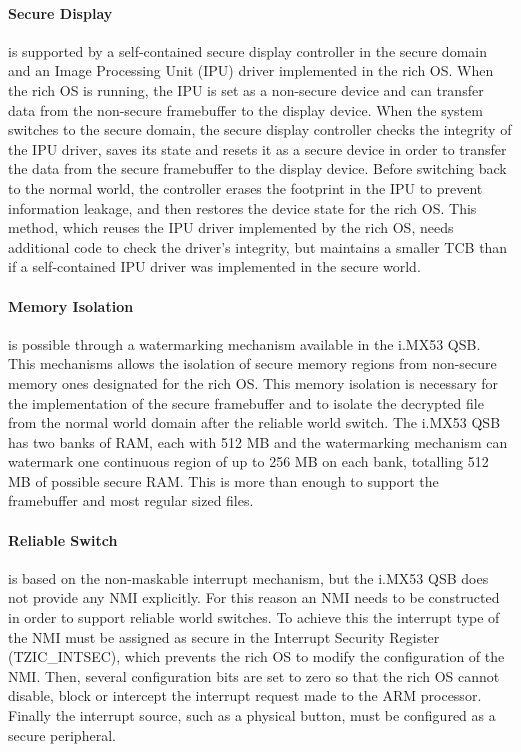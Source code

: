 \paragraph{Secure Display} is supported by a self-contained secure display controller in the secure domain and an Image Processing Unit (IPU) driver implemented in the rich OS. When the rich OS is running, the IPU is set as a non-secure device and can transfer data from the non-secure framebuffer to the display device. When the system switches to the secure domain, the secure display controller checks the integrity of the IPU driver, saves its state and resets it as a secure device in order to transfer the data from the secure framebuffer to the display device. Before switching back to the normal world, the controller erases the footprint in the IPU to prevent information leakage, and then restores the device state for the rich OS. This method, which reuses the IPU driver implemented by the rich OS, needs additional code to check the driver's integrity, but maintains a smaller TCB than if a self-contained IPU driver was implemented in the secure world.

\paragraph{Memory Isolation} is possible through a watermarking mechanism available in the i.MX53 QSB. This mechanisms allows the isolation of secure memory regions from non-secure memory ones designated for the rich OS. This memory isolation is necessary for the implementation of the secure framebuffer and to isolate the decrypted file from the normal world domain after the reliable world switch. The i.MX53 QSB has two banks of RAM, each with 512 MB and the watermarking mechanism can watermark one continuous region of up to 256 MB on each bank, totalling 512 MB of possible secure RAM. This is more than enough to support the framebuffer and most regular sized files.

\paragraph{Reliable Switch} is based on the non-maskable interrupt mechanism, but the i.MX53 QSB does not provide any \ac{NMI} explicitly. For this reason an \ac{NMI} needs to be constructed in order to support reliable world switches. To achieve this the interrupt type of the \ac{NMI} must be assigned as secure in the Interrupt Security Register (TZIC\_INTSEC), which prevents the rich OS to modify the configuration of the \ac{NMI}. Then, several configuration bits are set to zero so that the rich OS cannot disable, block or intercept the interrupt request made to the ARM processor. Finally the interrupt source, such as a physical button, must be configured as a secure peripheral.

